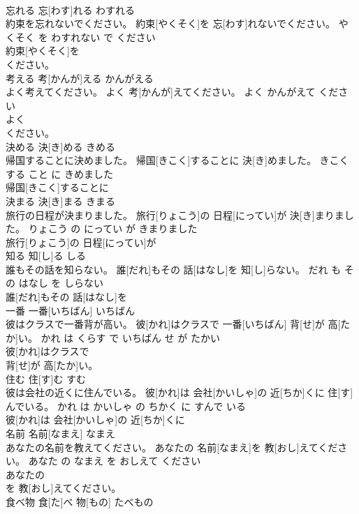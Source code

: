 \documentclass[8pt]{extreport}
\begin{document}
\begin{CJK}{UTF8}{min}
\\	忘れる	忘[わす]れる	わすれる	
\\	約束を忘れないでください。	約束[やくそく]を 忘[わす]れないでください。	やくそく を わすれない で ください	
\\	約束[やくそく]を
\\	ください。		
\\	考える	考[かんが]える	かんがえる	
\\	よく考えてください。	よく 考[かんが]えてください。	よく かんがえて ください	
\\	よく
\\	ください。		
\\	決める	決[き]める	きめる	
\\	帰国することに決めました。	帰国[きこく]することに 決[き]めました。	きこく する こと に きめました	
\\	帰国[きこく]することに
\\	決まる	決[き]まる	きまる	
\\	旅行の日程が決まりました。	旅行[りょこう]の 日程[にってい]が 決[き]まりました。	りょこう の にってい が きまりました	
\\	旅行[りょこう]の 日程[にってい]が
\\	知る	知[し]る	しる	
\\	誰もその話を知らない。	誰[だれ]もその 話[はなし]を 知[し]らない。	だれ も その はなし を しらない	
\\	誰[だれ]もその 話[はなし]を
\\	一番	一番[いちばん]	いちばん	
\\	彼はクラスで一番背が高い。	彼[かれ]はクラスで 一番[いちばん] 背[せ]が 高[たか]い。	かれ は くらす で いちばん せ が たかい	
\\	彼[かれ]はクラスで
\\	背[せ]が 高[たか]い。		
\\	住む	住[す]む	すむ	
\\	彼は会社の近くに住んでいる。	彼[かれ]は 会社[かいしゃ]の 近[ちか]くに 住[す]んでいる。	かれ は かいしゃ の ちかく に すんで いる	
\\	彼[かれ]は 会社[かいしゃ]の 近[ちか]くに
\\	名前	名前[なまえ]	なまえ	
\\	あなたの名前を教えてください。	あなたの 名前[なまえ]を 教[おし]えてください。	あなた の なまえ を おしえて ください	
\\	あなたの
\\	を 教[おし]えてください。		
\\	食べ物	食[た]べ 物[もの]	たべもの	

\end{CJK}
\end{document}
